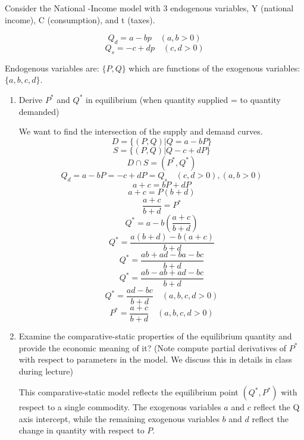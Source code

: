 \documentclass[12pt]{article}
\newcounter{ques}
\newenvironment{question}{\stepcounter{ques}{\noindent\bf Question \arabic{ques}:}}{\vspace{5mm}}
\begin{document}
\begin{question}
      Consider the National -Income model with 3 endogenous variables, Y (national income), C (consumption), and t (taxes).

      $$Q_d = a-bp \quad (a, b> 0)$$
      $$Q_s = -c +dp \quad (c, d > 0)$$

      Endogenous variables are:  $\{P, Q\}$ which are functions of the exogenous variables: $\{a,b,c, d\}$.
     


      \begin{enumerate}[label=(\alph*)]
            \item Derive $P^*$ and $Q^*$ in equilibrium (when quantity supplied = to quantity demanded)
      
            We want to find the intersection of the supply and demand curves.
            $$D = \{(P,Q) | Q = a-bP\} $$
            $$S = \{(P,Q) | Q -c +dP\} $$
            $$D \cap S = (P^*, Q^*)$$
            $$  Q_d = a-bP = -c +dP = Q_s \quad (c, d > 0), (a, b > 0)$$
            $$   a + c = bP +dP  $$
            $$   a + c = P(b +d)  $$
            $$   \frac{a + c}{b +d} = P^* $$
            $$ Q^* = a-b\left(\frac{a + c}{b +d}\right) $$
            $$ Q^* = \frac{a(b + d) - b(a + c)}{b +d} $$
            $$ Q^* = \frac{ab +ad - ba - bc}{b +d} $$
            $$ Q^* = \frac{ab - ab +ad - bc}{b +d} $$
            $$ Q^* = \frac{ad - bc}{b +d} \quad (a, b, c, d > 0)$$
            $$   P^* = \frac{a + c}{b +d}  \quad (a, b, c, d > 0)$$

            \item Examine the comparative-static properties of the equilibrium quantity and provide the economic meaning
            of it? (Note compute partial derivatives 
            of $P^*$ with respect to parameters in the model. We discuss this in details in class during lecture)

            This comparative-static model reflects the equilibrium point $(Q^*, P^*)$ with respect to a single commodity. 
            The exogenous variables $a$ and $c$ reflect the Q axis intercept, while the remaining exogenous variables $b$ and $d$ 
            reflect the change in quantity with respect to $P$.

      \end{enumerate}


\end{question}
\end{document}
